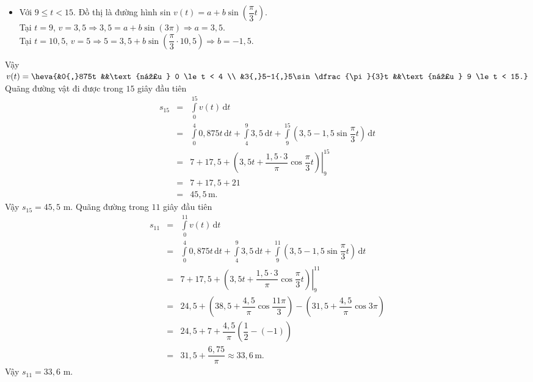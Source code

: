 \begin{ex}
{\begin{itemchoice}
\begin{itemize}
				\item Với $9 \le t < 15$. Đồ thị là đường hình sin $v(t) = a + b \sin\left(\dfrac{\pi}{3}t\right)$.\\
				Tại $t=9$, $v=3{,}5 \Rightarrow 3{,}5 = a + b\sin(3\pi) \Rightarrow a = 3{,}5$.\\
				Tại $t=10{,}5$, $v=5 \Rightarrow 5 = 3{,}5 + b \sin\left(\dfrac{\pi}{3} \cdot 10{,}5\right) \Rightarrow b = - 1{,}5$.
			\end{itemize}
			Vậy $v(t)=\heva{&0{,}875t &&\text{nếu } 0 \le t < 4 \\ &3{,}5-1{,}5\sin \dfrac{\pi}{3}t &&\text{nếu } 9 \le t < 15.}$
			\itemch Quãng đường vật đi được trong $15$ giây đầu tiên
			\allowdisplaybreaks
			\begin{eqnarray*}
				s_{15} &=& \displaystyle\int\limits_0^{15} v(t) \mathrm{\,d}t\\
				&=& \displaystyle\int\limits_0^4 0{,}875t \mathrm{\,d}t + \displaystyle\int\limits_4^9 3{,}5 \mathrm{\,d}t + \displaystyle\int\limits_9^{15} \left(3{,}5 - 1{,}5 \sin \dfrac{\pi}{3}t\right) \mathrm{\,d}t\\
				&=& 7 + 17{,}5 + \left. \left(3{,}5t + \dfrac{1{,}5 \cdot 3}{\pi} \cos \dfrac{\pi}{3}t\right) \right|_9^{15} \\
				&=& 7 + 17{,}5 + 21\\
				&=& 45{,}5 \, \text{m}.
			\end{eqnarray*}
			Vậy $s_{15}=45{,}5$ m.
			\itemch Quãng đường trong $11$ giây đầu tiên
			\allowdisplaybreaks
			\begin{eqnarray*}
				s_{11} &=& \displaystyle\int\limits_0^{11} v(t) \mathrm{\,d}t\\
				&=& \displaystyle\int\limits_0^4 0{,}875t \mathrm{\,d}t + \displaystyle\int\limits_4^9 3{,}5 \mathrm{\,d}t + \displaystyle\int\limits_9^{11} \left(3{,}5 - 1{,}5 \sin \dfrac{\pi}{3}t\right) \mathrm{\,d}t\\
				&=& 7 + 17{,}5 + \left. \left(3{,}5t + \dfrac{1{,}5 \cdot 3}{\pi} \cos \dfrac{\pi}{3}t\right) \right|_9^{11} \\
				&=& 24{,}5 + \left(38{,}5 + \dfrac{4{,}5}{\pi} \cos \dfrac{11\pi}{3}\right) - \left(31{,}5 + \dfrac{4{,}5}{\pi} \cos 3\pi\right)\\
				&=& 24{,}5 + 7 + \dfrac{4{,}5}{\pi} \left(\dfrac{1}{2} - (-1)\right) \\
				&=& 31{,}5 + \dfrac{6{,}75}{\pi} \approx 33{,}6 \, \text{m}.
			\end{eqnarray*}
			Vậy $s_{11}=33{,}6$ m.
		\end{itemchoice}
	}
\end{ex}

